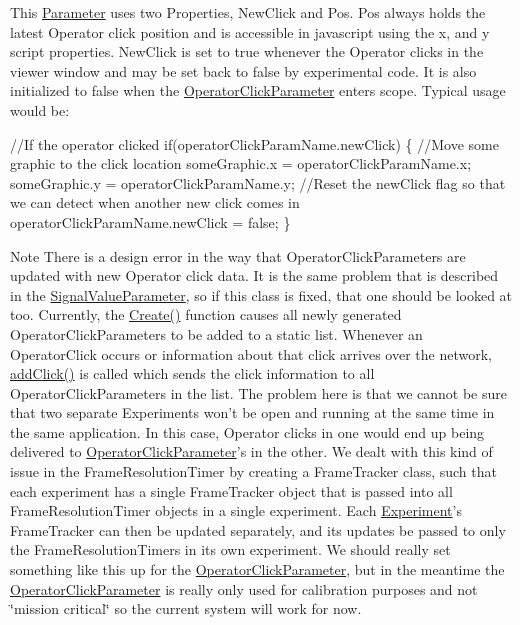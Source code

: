 This \hyperlink{class_picto_1_1_parameter}{Parameter} uses two Properties, New\-Click and Pos. Pos always holds the latest Operator click position and is accessible in javascript using the x, and y script properties. New\-Click is set to true whenever the Operator clicks in the viewer window and may be set back to false by experimental code. It is also initialized to false when the \hyperlink{class_picto_1_1_operator_click_parameter}{Operator\-Click\-Parameter} enters scope. Typical usage would be\-: 
\begin{DoxyCode}
\textcolor{comment}{//If the operator clicked}
\textcolor{keywordflow}{if}(operatorClickParamName.newClick)
\{
    \textcolor{comment}{//Move some graphic to the click location}
    someGraphic.x = operatorClickParamName.x;
    someGraphic.y = operatorClickParamName.y;
    \textcolor{comment}{//Reset the newClick flag so that we can detect when another new click comes in}
    operatorClickParamName.newClick = \textcolor{keyword}{false};
\}
\end{DoxyCode}
 \begin{DoxyNote}{Note}
There is a design error in the way that Operator\-Click\-Parameters are updated with new Operator click data. It is the same problem that is described in the \hyperlink{class_picto_1_1_signal_value_parameter}{Signal\-Value\-Parameter}, so if this class is fixed, that one should be looked at too. Currently, the \hyperlink{class_picto_1_1_operator_click_parameter_a00ce798699e1d01038af4251a6d96937}{Create()} function causes all newly generated Operator\-Click\-Parameters to be added to a static list. Whenever an Operator\-Click occurs or information about that click arrives over the network, \hyperlink{class_picto_1_1_operator_click_parameter_abd7c45377fa12ded4bfc175d9705f143}{add\-Click()} is called which sends the click information to all Operator\-Click\-Parameters in the list. The problem here is that we cannot be sure that two separate Experiments won't be open and running at the same time in the same application. In this case, Operator clicks in one would end up being delivered to \hyperlink{class_picto_1_1_operator_click_parameter}{Operator\-Click\-Parameter}'s in the other. We dealt with this kind of issue in the Frame\-Resolution\-Timer by creating a Frame\-Tracker class, such that each experiment has a single Frame\-Tracker object that is passed into all Frame\-Resolution\-Timer objects in a single experiment. Each \hyperlink{class_picto_1_1_experiment}{Experiment}'s Frame\-Tracker can then be updated separately, and its updates be passed to only the Frame\-Resolution\-Timers in its own experiment. We should really set something like this up for the \hyperlink{class_picto_1_1_operator_click_parameter}{Operator\-Click\-Parameter}, but in the meantime the \hyperlink{class_picto_1_1_operator_click_parameter}{Operator\-Click\-Parameter} is really only used for calibration purposes and not \char`\"{}mission critical\char`\"{} so the current system will work for now. 
\end{DoxyNote}
